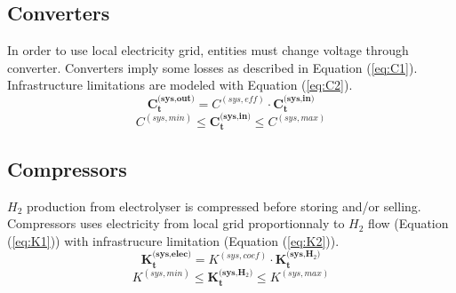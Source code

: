 \subsection{Converters} \label{Converter} \label{eq:C}
In order to use local electricity grid, entities must change voltage through converter. Converters imply some losses as described in Equation (\ref{eq:C1}). Infrastructure limitations are modeled with Equation (\ref{eq:C2}).
\begin{equation} \tag{C.1} \label{eq:C1}
    \textbf{C}_\textbf{t}^{\textbf{(sys,out)}} = C^{(sys,eff)} \cdot \textbf{C}_\textbf{t}^{\textbf{(sys,in)}}
\end{equation}
\begin{equation} \tag{C.2} \label{eq:C2}
    C^{(sys,min)} \leq \textbf{C}_\textbf{t}^{\textbf{(sys,in)}} \leq C^{(sys,max)}
\end{equation}

\subsection{Compressors} \label{Compressor} \label{eq:K}
$H_2$ production from electrolyser is compressed before storing and/or selling. 
Compressors uses electricity from local grid proportionnaly to $H_2$ flow (Equation (\ref{eq:K1})) with infrastrucure limitation (Equation (\ref{eq:K2})).
\begin{equation} \tag{K.1} \label{eq:K1}
    \textbf{K}_\textbf{t}^{\textbf{(sys,elec)}} = K^{(sys,coef)} \cdot \textbf{K}_\textbf{t}^{\textbf{(sys,H$_2$)}}
\end{equation}
\begin{equation} \tag{K.2} \label{eq:K2}
    K^{(sys,min)} \leq \textbf{K}_\textbf{t}^{\textbf{(sys,H$_2$)}} \leq K^{(sys,max)}
\end{equation}

